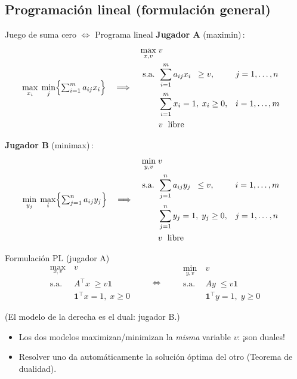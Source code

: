\documentclass{beamer}
\begin{document}
\subsection{Programación lineal (formulación general)}
\begin{frame}{Juego de suma cero \(\Longleftrightarrow\) Programa lineal}
\small
\textbf{Jugador A} (maximin)\,:  
\[
\max_{x_i}\;\min_j\Bigl\{\textstyle\sum_{i=1}^{m}a_{ij}x_i\Bigr\}
\quad\Longrightarrow\quad
\begin{aligned}
  \max_{x,v}\;& v\\
  \text{s.a. }& \sum_{i=1}^{m}a_{ij}x_i \;\;\ge v, && j=1,\dots,n \\[2pt]
              & \sum_{i=1}^{m}x_i = 1,\;  x_i\ge0, && i=1,\dots,m\\
              & v\;\hbox{ libre}
\end{aligned}
\]

\textbf{Jugador B} (minimax)\,:  
\[
\min_{y_j}\;\max_i\Bigl\{\textstyle\sum_{j=1}^{n}a_{ij}y_j\Bigr\}
\quad\Longrightarrow\quad
\begin{aligned}
  \min_{y,v}\;& v\\
  \text{s.a. }& \sum_{j=1}^{n}a_{ij}y_j \;\;\le v, && i=1,\dots,m \\[2pt]
              & \sum_{j=1}^{n}y_j = 1,\;  y_j\ge0, && j=1,\dots,n\\
              & v\;\hbox{ libre}
\end{aligned}
\]

\end{frame}
\begin{frame}{Formulación PL (jugador A)}
\small
\[
\boxed{
\begin{aligned}
  \max_{x,v}\ & v \\[-1pt]
  \text{s.a. }& A^\top x \;\ge v\mathbf{1} \\[-1pt]
              & \mathbf{1}^\top x = 1,\; x\ge0
\end{aligned}}
\qquad\Longleftrightarrow\qquad
\boxed{
\begin{aligned}
  \min_{y,v}\ & v \\[-1pt]
  \text{s.a. }& A y \;\le v\mathbf{1} \\[-1pt]
              & \mathbf{1}^\top y = 1,\; y\ge0
\end{aligned}}
\]
\vspace{-0.4em}
\begin{center}\scriptsize
(El modelo de la derecha es el dual: jugador B.)
\end{center}
\begin{itemize}[<+->]
  \item Los dos modelos maximizan/minimizan la \emph{misma} variable \(v\): ¡son duales!
  \item Resolver uno da automáticamente la solución óptima del otro (Teorema de dualidad).
\end{itemize}

\end{frame}
\end{document}
